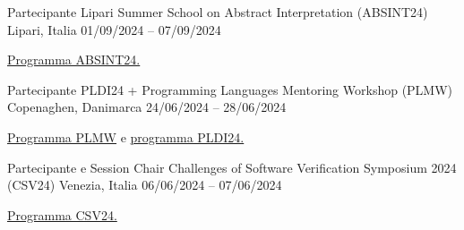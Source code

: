\begin{cventries}
    \cventry
        {Partecipante} %
        {Lipari Summer School on Abstract Interpretation (ABSINT24)} %
        {Lipari, Italia} %
        {01/09/2024 – 07/09/2024} %
        {
        \begin{cvitems} %
            \item {\href{https://drive.google.com/file/d/1uhLXjf0C\_OeptfQwxXwk\_3T8aFOkDMYC/view?pli=1}{Programma ABSINT24.}}
        \end{cvitems}
        }

    \cventry
        {Partecipante} %
        {PLDI24 + Programming Languages Mentoring Workshop (PLMW)} %
        {Copenaghen, Danimarca} %
        {24/06/2024 – 28/06/2024} %
        {
        \begin{cvitems} %
            \item {\href{https://pldi24.sigplan.org/track/PLMW-PLDI-2024\#program}{Programma PLMW}
            e \href{https://pldi24.sigplan.org/program/program-pldi-2024/}{programma PLDI24.}}
        \end{cvitems}
        }


    \cventry
        {Partecipante e Session Chair} %
        {Challenges of Software Verification Symposium 2024 (CSV24)} %
        {Venezia, Italia} %
        {06/06/2024 – 07/06/2024} %
        {
        \begin{cvitems} %
            \item {\href{https://unive-ssv.github.io/events/2024/06/06/csv.html}{Programma CSV24.}}
        \end{cvitems}
        }
\end{cventries}
